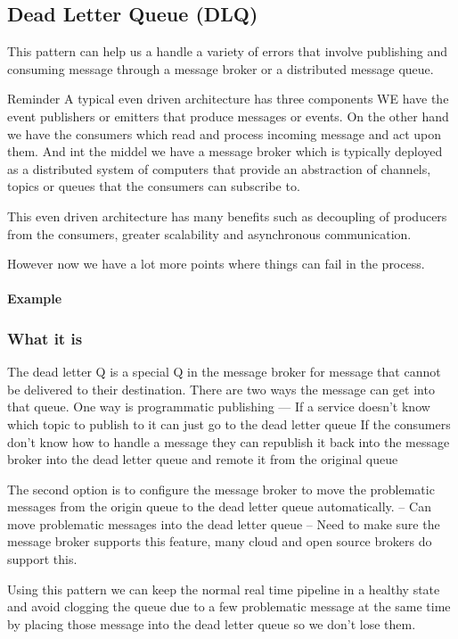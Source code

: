 \subsection{Dead Letter Queue (DLQ)}

This pattern can help us a handle a variety of errors that involve publishing and consuming message through a message broker or a distributed message queue.

Reminder
A typical even driven architecture has three components
WE have the event publishers or emitters that produce messages or events.
On the other hand we have the consumers which read and process incoming message and act upon them.
And int the middel we have a message broker which is typically deployed as a distributed system of computers that provide an abstraction of channels, topics or queues that the consumers can subscribe to.

This even driven architecture has many benefits such as decoupling of producers from the consumers, greater scalability and asynchronous communication.

However now we have a lot more points where things can fail in the process.

\paragraph{Example}

\subsubsection{What it is}
The dead letter Q is a special Q in the message broker for message that cannot be delivered to their destination.
There are two ways the message can get into that queue.
One way is programmatic publishing
--- If a service doesn't know which topic to publish to it can just go to the dead letter queue
If the consumers don't know how to handle a message they can republish it back into the message broker into the dead letter queue and remote it from the original queue

The second option is to configure the message broker to move the problematic messages from the origin queue to the dead letter queue automatically.
-- Can move problematic messages into the dead letter queue
-- Need to make sure the message broker supports this feature, many cloud and open source brokers do support this.

Using this pattern we can keep the normal real time pipeline in a healthy state and avoid clogging the queue due to a few problematic message at the same time by placing those message into the dead letter queue so we don't lose them.

